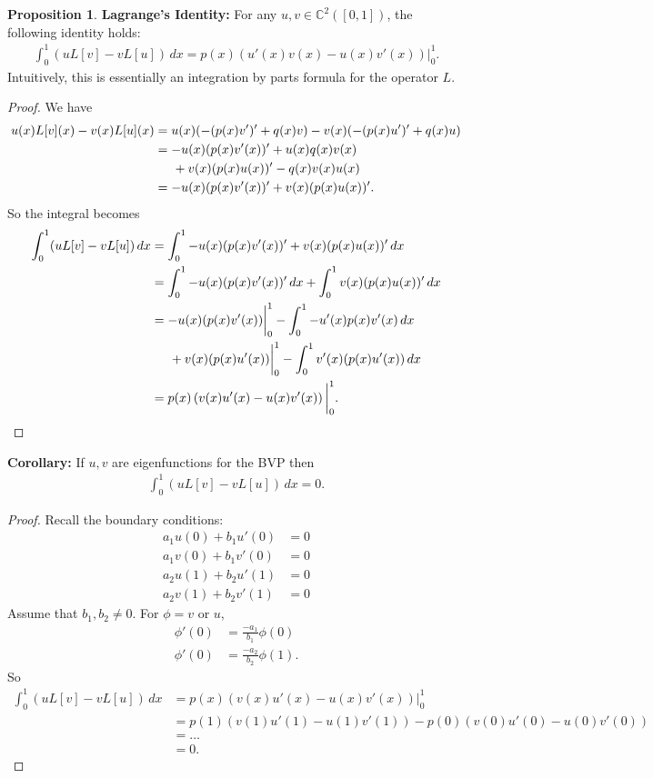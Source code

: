 \documentclass{article}
\theoremstyle{definition}
\newtheorem{prop}{Proposition}[section]
\begin{document}
\begin{prop}
	\textbf{Lagrange's Identity:} For any $u,v \in \mathbb{C}^2([0,1])$, the following identity holds:
	\begin{align*}
	\int^1_0 (uL[v] - vL[u])\,dx = p(x)\left( u'(x)v(x) - u(x)v'(x) \right)\bigg\vert^1_0.
	\end{align*}
	Intuitively, this is essentially an integration by parts formula for the operator $L$.
	
	
	\begin{proof}
		We have
		\begin{align*}
		u(x)L[v](x) - v(x)L[u](x) &= u(x)(-(p(x)v')' + q(x)v) - v(x)(-(p(x)u')' + q(x)u)\\
		&= -u(x)(p(x)v'(x))' + u(x)q(x)v(x)\\ &\hspace{0.5cm}+ v(x)(p(x)u(x))' - q(x)v(x)u(x)\\
		&= -u(x)(p(x)v'(x))' + v(x)(p(x)u(x))'.
		\end{align*}
		So the integral becomes
		\begin{align*}
		\int^1_0 (uL[v] - vL[u])\,dx &= \int^1_0 -u(x)(p(x)v'(x))' + v(x)(p(x)u(x))'\,dx\\
		&= \int^1_0 -u(x)(p(x)v'(x))' \,dx    + \int^1_0 v(x)(p(x)u(x))' \,dx\\
		&= -u(x)(p(x)v'(x))\bigg\vert^1_0 - \int^1_0 -u'(x)p(x)v'(x)\,dx\\ &\hspace{0.5cm}+v(x)(p(x)u'(x))\bigg\vert^1_0 - \int^1_0 v'(x)(p(x)u'(x))\,dx\\
		&= p(x)\left(v(x)u'(x) - u(x)v'(x)\right)\bigg\vert^1_0.
		\end{align*}
	\end{proof}
\end{prop}

\textbf{Corollary:} If $u,v$ are eigenfunctions for the BVP then
\begin{align*}
\int_0^1 (uL[v] - vL[u])\,dx = 0.
\end{align*}
\begin{proof}
	Recall the boundary conditions: 
	\begin{align*}
	a_1u(0) + b_1u'(0) &= 0\\
	a_1v(0) + b_1v'(0) &= 0\\
	a_2u(1) + b_2u'(1) &= 0\\
	a_2v(1) + b_2v'(1) &= 0
	\end{align*}
	Assume that $b_1,b_2\neq 0$. For $\phi = v$ or $u$,
	\begin{align*}
	\phi'(0) &= \frac{-a_1}{b_1}\phi(0)\\
	\phi'(0) &= \frac{-a_2}{b_2}\phi(1).
	\end{align*}
	So
	\begin{align*}
	\int_0^1 (uL[v] - vL[u])\,dx &= p(x)\left(v(x)u'(x) - u(x)v'(x)\right)\bigg\vert^1_0\\
	&= p(1)\left(v(1)u'(1) - u(1)v'(1)\right) - p(0)\left(v(0)u'(0) - u(0)v'(0)\right)\\
	&=\dots\\
	&= 0.
	\end{align*}
\end{proof}
\end{document}
